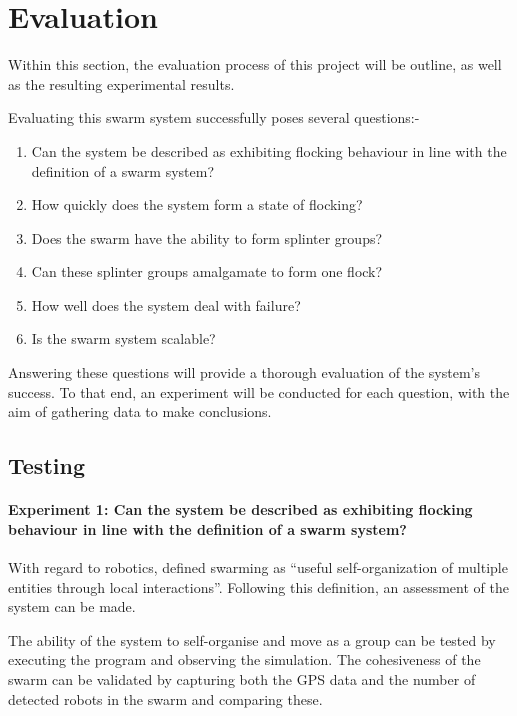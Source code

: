 \chapter{Evaluation}
\label{chap:Evaluation}

Within this section, the evaluation process of this project will be outline, as well as the resulting experimental results.

Evaluating this swarm system successfully poses several questions:-

\begin{enumerate}
	\item Can the system be described as exhibiting flocking behaviour in line with the definition of a swarm system?
	\item How quickly does the system form a state of flocking?
	\item Does the swarm have the ability to form splinter groups?
	\item Can these splinter groups amalgamate to form one flock?
	\item How well does the system deal with failure?
	\item Is the swarm system scalable?
\end{enumerate}

Answering these questions will provide a thorough evaluation of the system's success. To that end, an experiment will be conducted for each question, with the aim of gathering data to make conclusions.
\clearpage

\section{Testing}

\subsubsection{Experiment 1: Can the system be described as exhibiting flocking behaviour in line with the definition of a swarm system?}

With regard to robotics, \citeauthor{VanDykeParunak2004} defined swarming as ``useful self-organization of multiple entities through local interactions''. \cite{VanDykeParunak2004} Following this definition, an assessment of the system can be made.

The ability of the system to self-organise and move as a group can be tested by executing the program and observing the simulation. The cohesiveness of the swarm can be validated by capturing both the GPS data and the number of detected robots in the swarm and comparing these.

